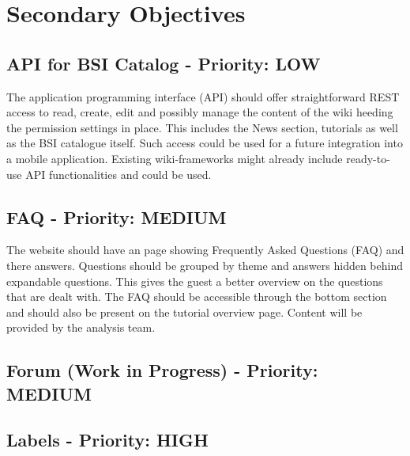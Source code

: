 \chapter{Secondary Objectives}
\section{API for BSI Catalog - Priority: LOW}
The application programming interface (API) should offer straightforward REST access to read, create, edit and possibly manage the content of the wiki heeding the permission settings in place.
This includes the News section, tutorials as well as the BSI catalogue itself.
Such access could be used for a future integration into a mobile application.
Existing wiki-frameworks might already include ready-to-use API functionalities and could be used.


\section{FAQ - Priority: MEDIUM}



\begin{tcolorbox}[breakable,colback=red!14,colframe=red!40!black,title=UPDATE 19/11/2017]
The website should have an page showing Frequently Asked Questions (FAQ) and there answers.
Questions should be grouped by theme and answers hidden behind expandable questions. 
This gives the guest a better overview on the questions that are dealt with.
The FAQ should be accessible through the bottom section and should also be present on the tutorial overview page.
Content will be provided by the analysis team.
\end{tcolorbox}


\section{Forum (Work in Progress) - Priority: MEDIUM}



\section{Labels - Priority: HIGH}
 

